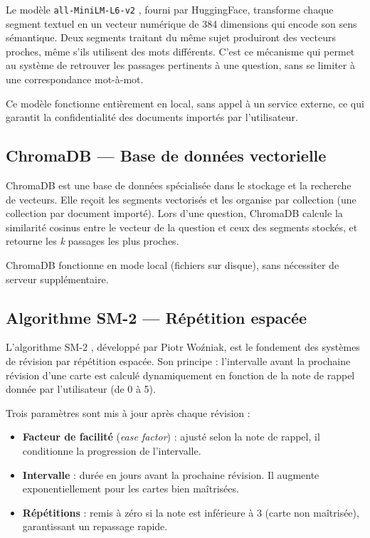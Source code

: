 Le modèle \texttt{all-MiniLM-L6-v2} \cite{sentencetransformers}, fourni par HuggingFace, transforme chaque segment textuel en un vecteur numérique de 384 dimensions qui encode son sens sémantique. Deux segments traitant du même sujet produiront des vecteurs proches, même s'ils utilisent des mots différents. C'est ce mécanisme qui permet au système de retrouver les passages pertinents à une question, sans se limiter à une correspondance mot-à-mot.

Ce modèle fonctionne entièrement en local, sans appel à un service externe, ce qui garantit la confidentialité des documents importés par l'utilisateur.

\subsection{ChromaDB — Base de données vectorielle}

ChromaDB \cite{chromadb} est une base de données spécialisée dans le stockage et la recherche de vecteurs. Elle reçoit les segments vectorisés et les organise par collection (une collection par document importé). Lors d'une question, ChromaDB calcule la similarité cosinus entre le vecteur de la question et ceux des segments stockés, et retourne les \textit{k} passages les plus proches.

ChromaDB fonctionne en mode local (fichiers sur disque), sans nécessiter de serveur supplémentaire.

\subsection{Algorithme SM-2 — Répétition espacée}

L'algorithme SM-2 \cite{sm2}, développé par Piotr Woźniak, est le fondement des systèmes de révision par répétition espacée. Son principe : l'intervalle avant la prochaine révision d'une carte est calculé dynamiquement en fonction de la note de rappel donnée par l'utilisateur (de 0 à 5).

Trois paramètres sont mis à jour après chaque révision :
\begin{itemize}
    \item \textbf{Facteur de facilité} (\textit{ease factor}) : ajusté selon la note de rappel, il conditionne la progression de l'intervalle.
    \item \textbf{Intervalle} : durée en jours avant la prochaine révision. Il augmente exponentiellement pour les cartes bien maîtrisées.
    \item \textbf{Répétitions} : remis à zéro si la note est inférieure à 3 (carte non maîtrisée), garantissant un repassage rapide.
\end{itemize}

